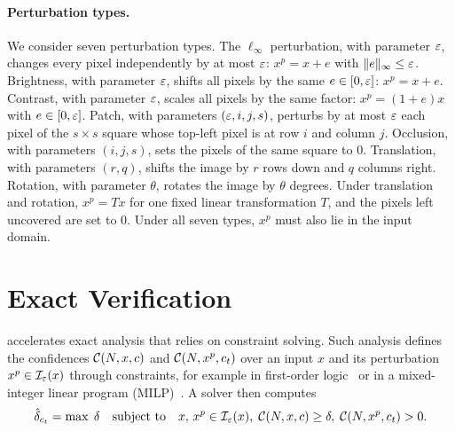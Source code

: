 \paragraph{Perturbation types.}
We consider seven perturbation types. The $\ell_\infty$ perturbation,
with parameter $\varepsilon$, changes every pixel independently by at most
$\varepsilon$: $x^{p} = x + e$ with $\|e\|_\infty \leq \varepsilon$. Brightness, with
parameter $\varepsilon$, shifts all pixels by the same $e \in [0,\varepsilon]$:
$x^{p} = x + e$. Contrast, with parameter $\varepsilon$, scales all pixels by
the same factor: $x^{p} = (1+e)x$ with $e \in [0,\varepsilon]$. Patch, with
parameters $(\varepsilon,i,j,s)$, perturbs by at most $\varepsilon$ each pixel of the
$s \times s$ square whose top-left pixel is at row $i$ and column $j$.
Occlusion, with parameters $(i,j,s)$, sets the pixels of the same
square to $0$. Translation, with parameters $(r,q)$, shifts the image
by $r$ rows down and $q$ columns right. Rotation, with parameter
$\theta$, rotates the image by $\theta$ degrees. Under translation and
rotation, $x^{p} = Tx$ for one fixed linear transformation $T$, and the
pixels left uncovered are set to $0$. Under all seven types, $x^{p}$ must also lie in the input
domain.

\section{Exact Verification}
\label{sec:background-exact-verification}

\tool accelerates exact analysis that relies on constraint solving.
Such analysis defines the confidences $\mathcal{C}(N,x,c)$ and
$\mathcal{C}(N,x^{p},c_t)$ over an input $x$ and its perturbation
$x^{p} \in \mathcal{I}_\varepsilon(x)$ through constraints, for example in first-order
logic~\citep{katz2019,katz2017reluplex} or in a mixed-integer
linear program (MILP)~\citep{tjeng2019}. A solver then computes
\[
  \hat{\delta}_{c_t} = \max\; \delta
  \quad \text{subject to} \quad
  x,\, x^{p} \in \mathcal{I}_\varepsilon(x),\;
  \mathcal{C}(N,x,c) \geq \delta,\;
  \mathcal{C}(N,x^{p},c_t) > 0 .
\]

